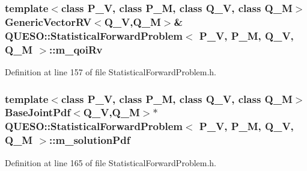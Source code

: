 \hypertarget{class_q_u_e_s_o_1_1_statistical_forward_problem_aa9ce415e5be95e04d6eea53c48fdea2c}{
\subsubsection[{m\-\_\-qoi\-Rv}]{\setlength{\rightskip}{0pt plus 5cm}template$<$class P\-\_\-\-V, class P\-\_\-\-M, class Q\-\_\-\-V, class Q\-\_\-\-M$>$ {\bf Generic\-Vector\-R\-V}$<$Q\-\_\-\-V,Q\-\_\-\-M$>$\& {\bf Q\-U\-E\-S\-O\-::\-Statistical\-Forward\-Problem}$<$ P\-\_\-\-V, P\-\_\-\-M, Q\-\_\-\-V, Q\-\_\-\-M $>$\-::m\-\_\-qoi\-Rv\hspace{0.3cm}{\ttfamily [private]}}}\label{class_q_u_e_s_o_1_1_statistical_forward_problem_aa9ce415e5be95e04d6eea53c48fdea2c}


Definition at line 157 of file Statistical\-Forward\-Problem.\-h.

\hypertarget{class_q_u_e_s_o_1_1_statistical_forward_problem_a67810b9d77e549b7eee76cc008e21e5b}{
\subsubsection[{m\-\_\-solution\-Pdf}]{\setlength{\rightskip}{0pt plus 5cm}template$<$class P\-\_\-\-V, class P\-\_\-\-M, class Q\-\_\-\-V, class Q\-\_\-\-M$>$ {\bf Base\-Joint\-Pdf}$<$Q\-\_\-\-V,Q\-\_\-\-M$>$$\ast$ {\bf Q\-U\-E\-S\-O\-::\-Statistical\-Forward\-Problem}$<$ P\-\_\-\-V, P\-\_\-\-M, Q\-\_\-\-V, Q\-\_\-\-M $>$\-::m\-\_\-solution\-Pdf\hspace{0.3cm}{\ttfamily [private]}}}\label{class_q_u_e_s_o_1_1_statistical_forward_problem_a67810b9d77e549b7eee76cc008e21e5b}


Definition at line 165 of file Statistical\-Forward\-Problem.\-h.

